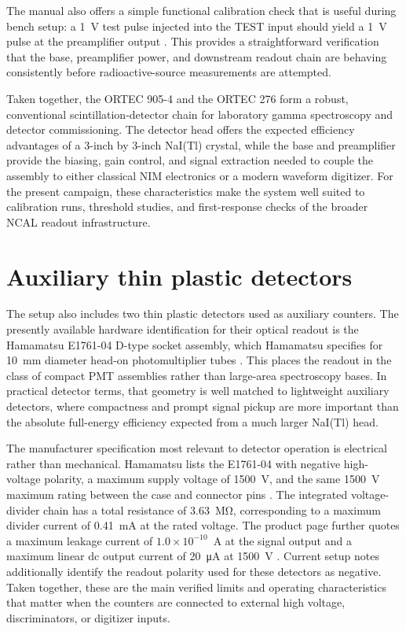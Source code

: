 The manual also offers a simple functional calibration check that is useful during bench setup: a \SI{1}{V} test pulse injected into the TEST input should yield a \SI{1}{V} pulse at the preamplifier output \citep{ORTEC276Manual}. This provides a straightforward verification that the base, preamplifier power, and downstream readout chain are behaving consistently before radioactive-source measurements are attempted.

Taken together, the ORTEC 905-4 and the ORTEC 276 form a robust, conventional scintillation-detector chain for laboratory gamma spectroscopy and detector commissioning. The detector head offers the expected efficiency advantages of a 3-inch by 3-inch NaI(Tl) crystal, while the base and preamplifier provide the biasing, gain control, and signal extraction needed to couple the assembly to either classical NIM electronics or a modern waveform digitizer. For the present campaign, these characteristics make the system well suited to calibration runs, threshold studies, and first-response checks of the broader NCAL readout infrastructure.

\section{Auxiliary thin plastic detectors}

The setup also includes two thin plastic detectors used as auxiliary counters. The presently available hardware identification for their optical readout is the Hamamatsu E1761-04 D-type socket assembly, which Hamamatsu specifies for 10~mm diameter head-on photomultiplier tubes \citep{HamamatsuE176104Page}. This places the readout in the class of compact PMT assemblies rather than large-area spectroscopy bases. In practical detector terms, that geometry is well matched to lightweight auxiliary detectors, where compactness and prompt signal pickup are more important than the absolute full-energy efficiency expected from a much larger NaI(Tl) head.

The manufacturer specification most relevant to detector operation is electrical rather than mechanical. Hamamatsu lists the E1761-04 with negative high-voltage polarity, a maximum supply voltage of \SI{1500}{V}, and the same \SI{1500}{V} maximum rating between the case and connector pins \citep{HamamatsuE176104Page}. The integrated voltage-divider chain has a total resistance of \SI{3.63}{\mega\ohm}, corresponding to a maximum divider current of \SI{0.41}{mA} at the rated voltage. The product page further quotes a maximum leakage current of $1.0\times10^{-10}$~A at the signal output and a maximum linear dc output current of \SI{20}{\micro A} at \SI{1500}{V} \citep{HamamatsuE176104Page}. Current setup notes additionally identify the readout polarity used for these detectors as negative. Taken together, these are the main verified limits and operating characteristics that matter when the counters are connected to external high voltage, discriminators, or digitizer inputs.


